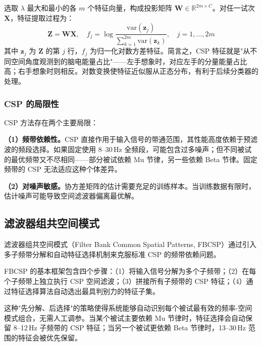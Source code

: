 选取 $\lambda$ 最大和最小的各 $m$ 个特征向量，构成投影矩阵 $\mathbf{W} \in \mathbb{R}^{2m \times C}$。对任一试次 $\mathbf{X}$，特征提取过程为：
\begin{equation}\label{eq:csp-feature}
\mathbf{Z} = \mathbf{W} \mathbf{X}, \quad f_j = \log \frac{\mathrm{var}(\mathbf{z}_j)}{\sum_{k=1}^{2m} \mathrm{var}(\mathbf{z}_k)}, \quad j = 1, \ldots, 2m
\end{equation}
其中 $\mathbf{z}_j$ 为 $\mathbf{Z}$ 的第 $j$ 行，$f_j$ 为归一化对数方差特征。简言之，CSP 特征就是"从不同空间角度观测到的脑电能量占比"——左手想象时，对应左手的分量能量占比高；右手想象时则相反。对数变换使特征近似服从正态分布，有利于后续分类器的处理。

\subsubsection{CSP 的局限性}

CSP 方法存在两个主要局限：

\textbf{（1）频带依赖性。}CSP 直接作用于输入信号的带通范围，其性能高度依赖于预滤波的频段选择。如果固定使用 8--30\,Hz 全频段，可能包含过多噪声；但不同被试的最优频带又不尽相同——部分被试依赖 Mu 节律，另一些依赖 Beta 节律。固定频带的 CSP 无法适应这种个体差异。

\textbf{（2）对噪声敏感。}协方差矩阵的估计需要充足的训练样本。当训练数据有限时，估计噪声可能导致空间滤波器偏离最优解。

\subsection{滤波器组共空间模式}
\label{sec:fbcsp-theory}

滤波器组共空间模式（Filter Bank Common Spatial Patterns, FBCSP）通过引入多子频带分解和自动特征选择机制来克服标准 CSP 的频带依赖问题。

FBCSP 的基本框架包含四个步骤：（1）将输入信号分解为多个子频带；（2）在每个子频带上独立执行 CSP 空间滤波；（3）拼接所有子频带的 CSP 特征；（4）通过特征选择算法自动选出最具判别力的特征子集。

这种"先分解、后选择"的策略使得系统能够自动识别每个被试最有效的频率-空间模式组合，无需人工调参。当某个被试主要依赖 Mu 节律时，特征选择会自动保留 8--12\,Hz 子频带的 CSP 特征；当另一个被试更依赖 Beta 节律时，13--30\,Hz 范围的特征会被优先保留。

